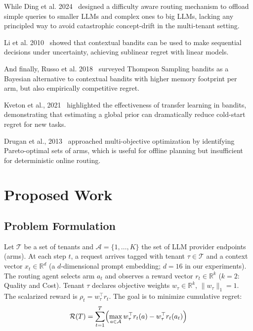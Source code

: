 \documentclass[conference]{IEEEtran}
\begin{document}
While Ding et al. 2024~\cite{ding2024hybridllm} designed a difficulty aware routing mechanism to offload simple queries to smaller LLMs and complex ones to big LLMs, lacking any principled way to avoid catastrophic concept-drift in the multi-tenant setting.

Li et al. 2010~\cite{li2010linucb} showed that contextual bandits can be used to make sequential decisions under uncertainty, achieving sublinear regret with linear models.

And finally, Russo et al. 2018~\cite{russo2018tutorial} surveyed Thompson Sampling bandits as a Bayesian alternative to contextual bandits with higher memory footprint per arm, but also empirically competitive regret.

Kveton et al., 2021~\cite{kveton2021meta} highlighted the effectiveness of transfer learning in bandits, demonstrating that estimating a global prior can dramatically reduce cold-start regret for new tasks.

Drugan et al., 2013~\cite{drugan2013pareto} approached multi-objective optimization by identifying Pareto-optimal sets of arms, which is useful for offline planning but insufficient for deterministic online routing.


\section{Proposed Work}


\subsection{Problem Formulation}

Let $\mathcal{T}$ be a set of tenants and $\mathcal{A} = \{1, \ldots, K\}$
the set of LLM provider endpoints (arms).
At each step $t$, a request arrives tagged with tenant $\tau \in \mathcal{T}$
and a context vector $x_t \in \mathbb{R}^d$ (a $d$-dimensional prompt
embedding; $d=16$ in our experiments).
The routing agent selects arm $a_t$ and observes a reward vector  
$r_t \in \mathbb{R}^k$ ($k=2$: Quality and Cost).
Tenant $\tau$ declares objective weights $w_\tau \in \mathbb{R}^k$,
$\|w_\tau\|_1 = 1$.
The scalarized reward is $\rho_t = w_\tau^\top r_t$.
The goal is to minimize cumulative regret:
\begin{equation}
  \mathcal{R}(T) = \sum_{t=1}^{T}
    \Bigl(\max_{a \in \mathcal{A}} w_\tau^\top r_t(a)
          - w_\tau^\top r_t(a_t)\Bigr)
\end{equation}
\end{document}
